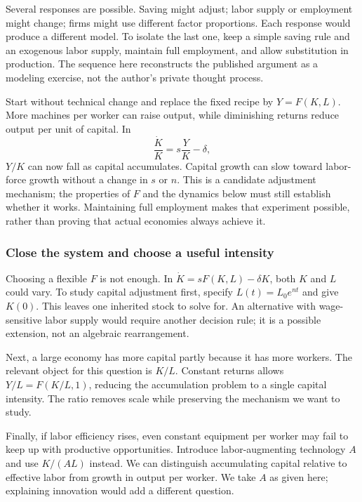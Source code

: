Several responses are possible. Saving might adjust; labor supply or employment
might change; firms might use different factor proportions. Each response
would produce a different model. To isolate the last one, keep a simple saving
rule and an exogenous labor supply, maintain full employment, and allow
substitution in production. The sequence here reconstructs the published
argument as a modeling exercise, not the author's private thought process.

Start without technical change and replace the fixed recipe by $Y=F(K,L)$.
More machines per worker can raise output, while diminishing returns reduce
output per unit of capital. In
\begin{equation}
\frac{\dot K}{K}=s\frac{Y}{K}-\delta,
\end{equation}
$Y/K$ can now fall as capital accumulates. Capital growth can slow toward
labor-force growth without a change in $s$ or $n$. This is a candidate
adjustment mechanism; the properties of $F$ and the dynamics below must still
establish whether it works. Maintaining full employment makes that experiment
possible, rather than proving that actual economies always achieve it.

\subsubsection{Close the system and choose a useful intensity}

Choosing a flexible $F$ is not enough. In $\dot K=sF(K,L)-\delta K$, both
$K$ and $L$ could vary. To study capital adjustment first, specify
$L(t)=L_0e^{nt}$ and give $K(0)$. This leaves one inherited stock to solve for.
An alternative with wage-sensitive labor supply would require another decision
rule; it is a possible extension, not an algebraic rearrangement.

Next, a large economy has more capital partly because it has more workers.
The relevant object for this question is $K/L$. Constant returns allows
$Y/L=F(K/L,1)$, reducing the accumulation problem to a single capital intensity.
The ratio removes scale while preserving the mechanism we want to study.

Finally, if labor efficiency rises, even constant equipment per worker may
fail to keep up with productive opportunities. Introduce labor-augmenting
technology $A$ and use $K/(AL)$ instead. We can distinguish accumulating capital
relative to effective labor from growth in output per worker. We take $A$ as
given here; explaining innovation would add a different question.

